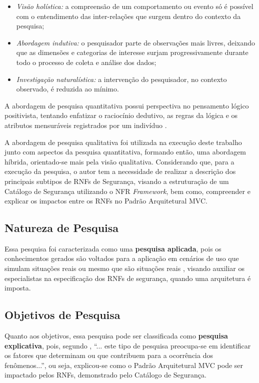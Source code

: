 \begin{itemize}
	\item \textit{Visão holística:} a compreensão de um comportamento ou evento só é possível com o entendimento das inter-relações que surgem dentro do contexto da pesquisa;
	\item \textit{Abordagem indutiva:} o pesquisador parte de observações mais livres, deixando que as dimensões e categorias de interesse surjam progressivamente durante todo o processo de coleta e análise dos dados;
	\item \textit{Investigação naturalística:} a intervenção do pesquisador, no contexto observado, é reduzida ao mínimo.
\end{itemize}

A abordagem de pesquisa quantitativa possui perspectiva no pensamento lógico positivista, tentando enfatizar o raciocínio dedutivo, as regras da lógica e os atributos mensuráveis registrados por um indivíduo \cite{gerhardt2009metodos}. 

A abordagem de pesquisa qualitativa foi utilizada na execução deste trabalho junto com aspectos da pesquisa quantitativa, formando então, uma abordagem híbrida, orientado-se mais pela visão qualitativa. Considerando que, para a execução da pesquisa, o autor tem a necessidade de realizar a descrição dos principais subtipos de RNFs de Segurança, visando a estruturação de um Catálogo de Segurança utilizando o NFR \textit{Framework}, bem como, compreender e explicar os impactos entre os RNFs no Padrão Arquitetural MVC.  

\subsection{Natureza de Pesquisa}
\label{sub:naturezaDePesquisa}

Essa pesquisa foi caracterizada como uma \textbf{pesquisa aplicada}, pois os conhecimentos gerados são voltados para a aplicação em cenários de uso que simulam situações reais ou mesmo que são situações reais \cite{gerhardt2009metodos}, visando auxiliar os especialistas na especificação dos RNFs de segurança, quando uma arquitetura é imposta. 

\subsection{Objetivos de Pesquisa}
\label{sub:objetivosDePesquisa}

Quanto aos objetivos, essa pesquisa pode ser classificada como \textbf{pesquisa explicativa}, pois, segundo \cite{gil2002elaborar}, “... este tipo de pesquisa preocupa-se em identificar os fatores que determinam ou que contribuem para a ocorrência dos fenômenos...”, ou seja, explicou-se como o Padrão Arquitetural MVC pode ser impactado pelos RNFs, demonstrado pelo Catálogo de Segurança.

